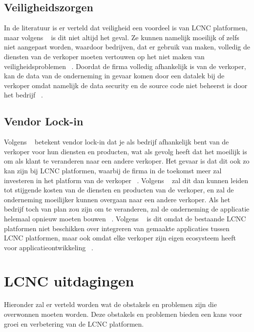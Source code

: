 \subsection*{Veiligheidszorgen}
\label{subsec:veiligheidszorgen}
In de literatuur is er verteld dat veiligheid een voordeel is van LCNC platformen, maar volgens ~\textcite{Yan2021} is dit niet altijd het geval. 
Ze kunnen namelijk moeilijk of zelfs niet aangepast worden, waardoor bedrijven, dat er gebruik van maken, volledig de diensten van de verkoper 
moeten vertouwen op het niet maken van veiligheidsproblemen ~\autocite{Yan2021}. 
Doordat de firma volledig afhankelijk is van de verkoper, kan de data van de onderneming in gevaar komen door een datalek bij de verkoper omdat namelijk 
de data security en de source code niet beheerst is door het bedrijf ~\autocite{Yan2021}.

\subsection*{Vendor Lock-in}
\label{subsec:technische-schulden}
Volgens ~\textcite{Yan2021} betekent vendor lock-in dat je als bedrijf afhankelijk bent van de verkoper voor hun diensten en producten, 
wat als gevolg heeft dat het moeilijk is om als klant te veranderen naar een andere verkoper. Het gevaar is dat dit ook zo kan zijn bij LCNC platformen, 
waarbij de firma in de toekomst meer zal investeren in het platform van de verkoper ~\autocite{Yan2021}. 
Volgens ~\textcite{Yan2021} zal dit dan kunnen leiden tot stijgende kosten van de diensten en producten van de verkoper, 
en zal de onderneming moeilijker kunnen overgaan naar een andere verkoper. Als het bedrijf toch van plan zou zijn om te veranderen,
 zal de onderneming de applicatie helemaal opnieuw moeten bouwen ~\autocite{Sufi_2023}. 
 Volgens ~\textcite{Sufi_2023} is dit omdat de bestaande LCNC platformen niet beschikken over integreren van gemaakte applicaties tussen LCNC platformen, 
 maar ook omdat elke verkoper zijn eigen ecosysteem heeft voor applicatieontwikkeling ~\autocite{Sufi_2023}.


\section{LCNC uitdagingen}
\label{sec:lcnc-uitdagingen}
Hieronder zal er verteld worden wat de obstakels en problemen zijn die overwonnen moeten worden. Deze obstakels en problemen bieden een kans voor groei en
verbetering van de LCNC platformen.
